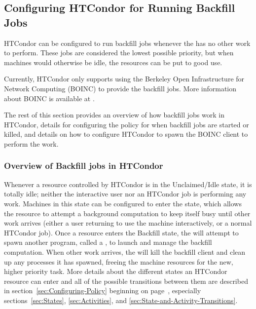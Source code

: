 \subsection{\label{sec:Backfill}Configuring HTCondor for Running Backfill Jobs} 


HTCondor can be configured to run
backfill jobs whenever the  has no other work to
perform.
These jobs are considered the lowest possible priority, but when
machines would otherwise be idle, the resources can be put to good 
use.

Currently, HTCondor only supports using the Berkeley Open Infrastructure
for Network Computing (BOINC) to provide the backfill jobs.
More information about BOINC is available at
.

The rest of this section provides an overview of how backfill jobs
work in HTCondor, details for configuring the policy for when backfill
jobs are started or killed, and details on how to configure HTCondor to
spawn the BOINC client to perform the work.


\subsubsection{\label{sec:Backfill-Overview}Overview of Backfill jobs
in HTCondor}


Whenever a resource controlled by HTCondor is in the Unclaimed/Idle
state, it is totally idle; neither the interactive user nor an HTCondor
job is performing any work.
Machines in this state can be configured to enter the 
state, which allows the resource to attempt a background
computation to keep itself busy until other work arrives (either a 
user returning to use the machine interactively, or a normal HTCondor
job).
Once a resource enters the Backfill state, the  will
attempt to spawn another program, called a , to
launch and manage the backfill computation.
When other work arrives, the  will kill the backfill
client and clean up any processes it has spawned, freeing the machine
resources for the new, higher priority task.
More details about the different states an HTCondor resource can enter
and all of the possible transitions between them are described in
section~\ref{sec:Configuring-Policy} beginning on
page~\pageref{sec:Configuring-Policy}, especially
sections~\ref{sec:States}, \ref{sec:Activities}, and
\ref{sec:State-and-Activity-Transitions}.

